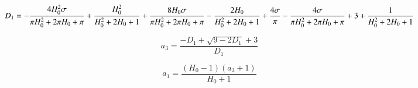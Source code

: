     
 
            
    
    \begin{equation}
D_{1} = - \frac{4 H_{0}^{2} \sigma}{\pi H_{0}^{2} \\ + 2 \pi H_{0} \\ + \pi} \\ + \frac{H_{0}^{2}}{H_{0}^{2} \\ + 2 H_{0} \\ + 1} \\ + \frac{8 H_{0} \sigma}{\pi H_{0}^{2} \\ + 2 \pi H_{0} \\ + \pi} - \frac{2 H_{0}}{H_{0}^{2} \\ + 2 H_{0} \\ + 1} \\ + \frac{4 \sigma}{\pi} - \frac{4 \sigma}{\pi H_{0}^{2} \\ + 2 \pi H_{0} \\ + \pi} \\ + 3 \\ + \frac{1}{H_{0}^{2} \\ + 2 H_{0} \\ + 1}
\label{eq:equation}
\end{equation}

    
 
            
    
    \begin{equation}
a_{3} = \frac{- D_{1} + \sqrt{9 - 2 D_{1}} + 3}{D_{1}}
\label{eq:equation}
\end{equation}

    
 
            
    
    \begin{equation}
a_{1} = \frac{\left(H_{0} - 1\right) \left(a_{3} + 1\right)}{H_{0} + 1}
\label{eq:equation}
\end{equation}

    


    
    



    
